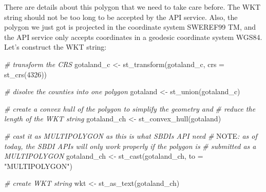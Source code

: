 \documentclass[
  10pt,
]{article}
\newenvironment{Shaded}{\begin{snugshade}}{\end{snugshade}}
\newcommand{\AlertTok}[1]{\textcolor[rgb]{0.94,0.16,0.16}{#1}}
\newcommand{\AttributeTok}[1]{\textcolor[rgb]{0.77,0.63,0.00}{#1}}
\newcommand{\CommentTok}[1]{\textcolor[rgb]{0.56,0.35,0.01}{\textit{#1}}}
\newcommand{\DecValTok}[1]{\textcolor[rgb]{0.00,0.00,0.81}{#1}}
\newcommand{\FunctionTok}[1]{\textcolor[rgb]{0.00,0.00,0.00}{#1}}
\newcommand{\NormalTok}[1]{#1}
\newcommand{\OtherTok}[1]{\textcolor[rgb]{0.56,0.35,0.01}{#1}}
\newcommand{\SpecialCharTok}[1]{\textcolor[rgb]{0.00,0.00,0.00}{#1}}
\newcommand{\StringTok}[1]{\textcolor[rgb]{0.31,0.60,0.02}{#1}}
\begin{document}
\begin{Shaded}
\end{Shaded}

There are details about this polygon that we need to take care before.
The WKT string should not be too long to be accepted by the API service.
Also, the polygon we just got is projected in the coordinate system
SWEREF99 TM, and the API service only accepts coordinates in a geodesic
coordinate system WGS84. Let's construct the WKT string:

\begin{Shaded}
\begin{Highlighting}[]
\CommentTok{\# transform the CRS}
\NormalTok{gotaland\_c }\OtherTok{\textless{}{-}} \FunctionTok{st\_transform}\NormalTok{(gotaland\_c,}
                           \AttributeTok{crs =} \FunctionTok{st\_crs}\NormalTok{(}\DecValTok{4326}\NormalTok{))}

\CommentTok{\# disolve the counties into one polygon}
\NormalTok{gotaland }\OtherTok{\textless{}{-}} \FunctionTok{st\_union}\NormalTok{(gotaland\_c)}

\CommentTok{\# create a convex hull of the polygon to simplify the geometry and }
\CommentTok{\# reduce the length of the WKT string}
\NormalTok{gotaland\_ch }\OtherTok{\textless{}{-}} \FunctionTok{st\_convex\_hull}\NormalTok{(gotaland)}

\CommentTok{\# cast it as MULTIPOLYGON as this is what SBDIs API need}
\CommentTok{\# }\AlertTok{NOTE}\CommentTok{: as of today, the SBDI APIs will only work properly if the polygon is }
\CommentTok{\# submitted as a MULTIPOLYGON}
\NormalTok{gotaland\_ch }\OtherTok{\textless{}{-}} \FunctionTok{st\_cast}\NormalTok{(gotaland\_ch, }\AttributeTok{to =} \StringTok{"MULTIPOLYGON"}\NormalTok{)}

\CommentTok{\# create WKT string}
\NormalTok{wkt }\OtherTok{\textless{}{-}} \FunctionTok{st\_as\_text}\NormalTok{(gotaland\_ch)}
\end{Highlighting}
\end{Shaded}
\end{document}
